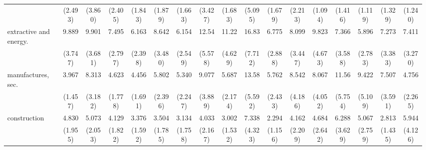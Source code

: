 {\begin{tabular}{l*{16}{c}}
                    &     (2.493)         &     (3.860)         &     (2.405)         &     (1.843)         &     (1.879)         &     (1.663)         &     (3.427)         &     (1.683)         &     (5.095)         &     (1.679)         &     (2.213)         &     (1.094)         &     (1.416)         &     (1.119)         &     (1.329)         &     (1.240)         \\
[1em]
extractive and energy.&       9.889\sym{***}&       9.901\sym{***}&       7.495\sym{***}&       6.163\sym{***}&       8.642\sym{***}&       6.154\sym{***}&       12.54\sym{***}&       11.22\sym{***}&       16.83\sym{***}&       6.775\sym{***}&       8.099\sym{***}&       9.823\sym{***}&       7.366\sym{***}&       5.896\sym{***}&       7.273\sym{***}&       7.411\sym{***}\\
                    &     (3.747)         &     (3.681)         &     (2.797)         &     (2.398)         &     (3.480)         &     (2.549)         &     (5.578)         &     (4.629)         &     (7.712)         &     (2.888)         &     (3.447)         &     (4.673)         &     (3.588)         &     (2.783)         &     (3.383)         &     (3.270)         \\
[1em]
manufactures, sec.  &       3.967\sym{***}&       8.313\sym{***}&       4.623\sym{***}&       4.456\sym{***}&       5.802\sym{***}&       5.340\sym{***}&       9.077\sym{***}&       5.687\sym{***}&       13.58\sym{***}&       5.762\sym{***}&       8.542\sym{***}&       8.067\sym{***}&       11.56\sym{***}&       9.422\sym{***}&       7.507\sym{***}&       4.756\sym{**} \\
                    &     (1.457)         &     (3.182)         &     (1.778)         &     (1.691)         &     (2.396)         &     (2.247)         &     (3.889)         &     (2.174)         &     (5.592)         &     (2.433)         &     (4.186)         &     (4.052)         &     (5.754)         &     (5.109)         &     (3.591)         &     (2.265)         \\
[1em]
construction        &       4.830\sym{***}&       5.073\sym{***}&       4.129\sym{**} &       3.376\sym{**} &       3.504\sym{*}  &       3.134\sym{*}  &       4.033\sym{**} &       3.002\sym{*}  &       7.338\sym{***}&       2.294         &       4.162\sym{**} &       4.684\sym{**} &       6.288\sym{**} &       5.067\sym{**} &       2.813\sym{*}  &       5.944\sym{*}  \\
                    &     (1.955)         &     (2.053)         &     (1.822)         &     (1.592)         &     (1.785)         &     (1.758)         &     (2.167)         &     (1.532)         &     (4.323)         &     (1.156)         &     (2.209)         &     (2.642)         &     (3.629)         &     (2.759)         &     (1.435)         &     (4.126)         \\

\end{tabular}}

